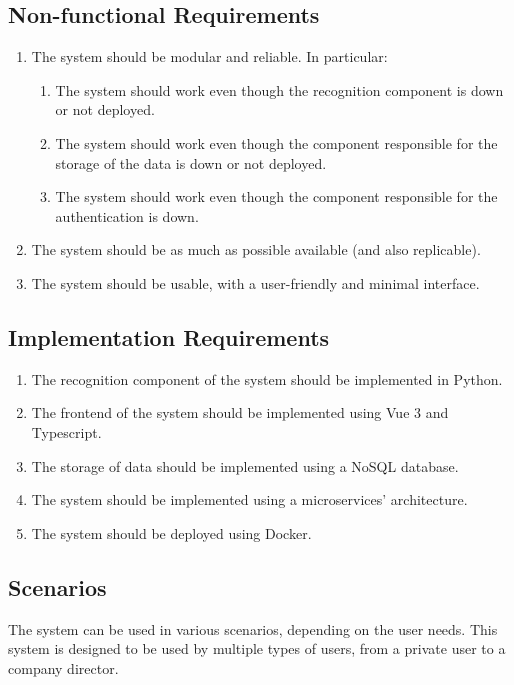 \documentclass{scrartcl}
\begin{document}
    \subsection{Non-functional Requirements}\label{subsec:non-functional-requirements}
    \begin{enumerate}
        \item \label{itm:non-func-1} The system should be modular and reliable.
        In particular:
        \begin{enumerate}
            \item The system should work even though the recognition component is down or not deployed.
            \item The system should work even though the component responsible for the storage of the data is down or not deployed.
            \item The system should work even though the component responsible for the authentication is down.
        \end{enumerate}
        \item \label{itm:non-func-2} The system should be as much as possible available (and also replicable).
        \item \label{itm:non-func-3} The system should be usable, with a user-friendly and minimal interface.
    \end{enumerate}

    \subsection{Implementation Requirements}\label{subsec:implementation-requirements}
    \begin{enumerate}
        \item \label{itm:impl-1} The recognition component of the system should be implemented in Python.
        \item \label{itm:impl-2} The frontend of the system should be implemented using Vue 3 and Typescript.
        \item \label{itm:impl-3} The storage of data should be implemented using a NoSQL database.
        \item \label{itm:impl-4} The system should be implemented using a microservices' architecture.
        \item \label{itm:impl-5} The system should be deployed using Docker.
    \end{enumerate}

    \subsection{Scenarios}
    The system can be used in various scenarios, depending on the user needs.
    This system is designed to be used by multiple types of users, from a private user to a company director.
\end{document}
